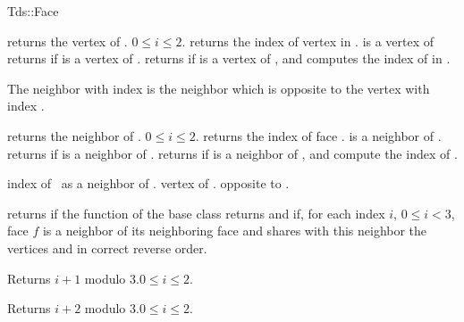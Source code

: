 \begin{ccClass}{Tds::Face}
\begin{ccAdvanced}
\end{ccAdvanced}


{returns  the vertex  of \ccVar.
\ccPrecond $0\leq i \leq 2$.}
\ccGlue
{}
{returns the index of vertex  in \ccVar. \ccPrecond {} is
a vertex of \ccVar}
\ccGlue
{}
{returns  if   is a vertex of \ccVar.}
\ccGlue
{}
{returns  if   is a vertex of \ccVar, and
 computes the index  of  in .}




The neighbor with index  is the neighbor which is opposite
to the vertex with index .


{returns  the neighbor  of \ccVar. 
\ccPrecond $0\leq i \leq 2$.
}
\ccGlue
{}
{returns the index of face .
\ccPrecond {} is a neighbor of \ccVar.}
\ccGlue
{}
{returns  if  is a neighbor of \ccVar.}
\ccGlue
{}
{returns  if  is a neighbor of \ccVar,  and
compute the index  of .}

{index of \ccVar\ as a neighbor of \ccVar.}
\ccGlue
{}
{vertex of \ccVar.} opposite to  \ccVar.


\begin{ccAdvanced}


{returns  if  the function 
 of the base class
returns  and if, for each index $i$, $0 \le i < 3$,
face $f$ is a neighbor of its neighboring face 
and shares with this neighbor the  vertices  and 
in correct reverse order.}






\end{ccAdvanced}



{Returns $i+1$ modulo 3.\ccPrecond $0\leq i \leq 2$.}

{Returns $i+2$ modulo 3.\ccPrecond $0\leq i \leq 2$.}

\end{ccClass}

